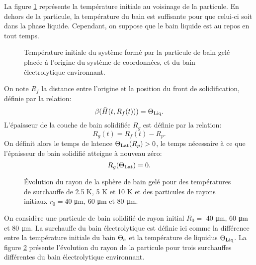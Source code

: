 La figure \ref{fig:particle-initial-temperature} représente la
température initiale au voisinage de la particule. En dehors de la
particule, la température du bain est suffisante pour que celui-ci
soit dans la phase liquide. Cependant, on suppose que le bain liquide
est au repos en tout temps.

\begin{figure}[!h]
  \begin{center}
    
    \caption{Température initiale du système formé par la particule de
      bain gelé placée à l'origine du système de coordonnées, et du
      bain électrolytique environnant.}
    \label{fig:particle-initial-temperature}
  \end{center}
\end{figure}

On note $R_f$ la distance entre l'origine et la position du front de
solidification, définie par la relation:
\begin{equation}
\beta(\tilde{H}(t, R_f(t))) = \Theta_\text{Liq}.
\end{equation}
L'épaisseur de la couche de bain solidifiée $R_g$ est définie par la
relation:
\begin{equation}
R_g(t) = R_f(t) - R_p.
\end{equation}
On définit alors le temps de latence $\Theta_\text{Lat}(R_p) > 0$, le temps
nécessaire à ce que l'épaisseur de bain solidifié atteigne à nouveau
zéro:
\begin{equation}
  R_g(\Theta_\text{Lat}) = 0.
\end{equation}

\begin{figure}
\begin{center}
  
  
  
  \caption{Évolution du rayon de la sphère de bain gelé pour des
    températures de surchauffe de \num{2.5} \si{\kelvin},
    \num{5} \si{\kelvin} et \num{10} \si{\kelvin} et des particules de
    rayons initiaux $r_0 = $\num{40} \si{\micro\meter},
    \num{60} \si{\micro\meter} et \num{80} \si{\micro\meter}.}
  \label{fig:freeze-radius}
\end{center}
\end{figure}
On considère une particule de bain solidifié de rayon initial $R_0 =$
\num{40} \si{\micro\meter}, \num{60} \si{\micro\meter} et
\num{80} \si{\micro\meter}. La surchauffe du bain électrolytique est
définie ici comme la différence entre la température initiale du bain
$\Theta_\mathrm{e}$ et la température de liquidus $\Theta_\text{Liq}$. La figure
\ref{fig:freeze-radius} présente l'évolution du rayon de la particule
pour trois surchauffes différentes du bain électrolytique environnant.

